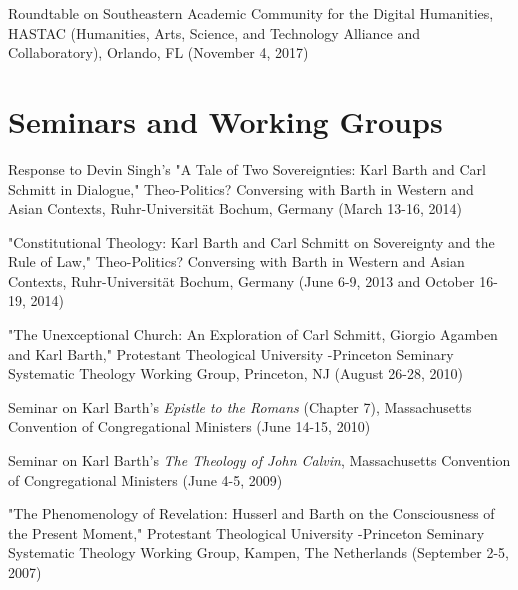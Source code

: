 \documentclass[10pt]{res} %
\begin{document}
\begin{resume}
\begin{hangparas}{.25in}{1}Roundtable on Southeastern Academic Community for the Digital Humanities, HASTAC (Humanities, Arts, Science, and Technology Alliance and Collaboratory), Orlando, FL (November 4, 2017)\end{hangparas}

\section{Seminars and Working Groups}

\begin{hangparas}{.25in}{1}Response to Devin Singh’s "A Tale of Two Sovereignties: Karl Barth and Carl Schmitt in Dialogue," Theo-Politics? Conversing with Barth in Western and Asian Contexts, Ruhr-Universität Bochum, Germany (March 13-16, 2014)\end{hangparas}

\begin{hangparas}{.25in}{1}"Constitutional Theology: Karl Barth and Carl Schmitt on Sovereignty and the Rule of Law," Theo-Politics? Conversing with Barth in Western and Asian Contexts, Ruhr-Universität Bochum, Germany (June 6-9, 2013 and October 16-19, 2014)\end{hangparas}

\begin{hangparas}{.25in}{1}"The Unexceptional Church: An Exploration of Carl Schmitt, Giorgio Agamben and Karl Barth," Protestant Theological University -Princeton Seminary Systematic Theology Working Group, Princeton, NJ (August 26-28, 2010)\end{hangparas}

\begin{hangparas}{.25in}{1}Seminar on Karl Barth’s \textit{Epistle to the Romans} (Chapter 7), Massachusetts Convention of Congregational Ministers (June 14-15, 2010)\end{hangparas}

\begin{hangparas}{.25in}{1}Seminar on Karl Barth’s \textit{The Theology of John Calvin}, Massachusetts Convention of Congregational Ministers (June 4-5, 2009)\end{hangparas}

\begin{hangparas}{.25in}{1}"The Phenomenology of Revelation: Husserl and Barth on the Consciousness of the Present Moment," Protestant Theological University -Princeton Seminary Systematic Theology Working Group, Kampen, The Netherlands (September 2-5, 2007)\end{hangparas}


\end{resume}
\end{document}
